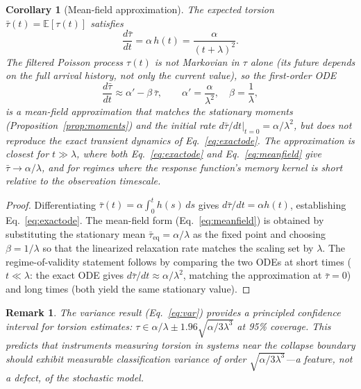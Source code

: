 \documentclass[11pt]{article}
\theoremstyle{plain}
\newtheorem{remark}{Remark}[section]
\newtheorem{corollary}{Corollary}[section]
\begin{document}
\begin{corollary}[Mean-field approximation]\label{cor:meanfield}
The expected torsion $\bar\tau(t) = \mathbb{E}[\tau(t)]$ satisfies
\begin{equation}\label{eq:exactode}
  \frac{d\bar\tau}{dt} = \alpha\, h(t) = \frac{\alpha}{(t + \lambda)^2}.
\end{equation}
The filtered Poisson process $\tau(t)$ is not Markovian in $\tau$ alone (its future depends on the
full arrival history, not only the current value), so the first-order ODE
\begin{equation}\label{eq:meanfield}
  \frac{d\bar\tau}{dt} \approx \alpha' - \beta\, \bar\tau, \qquad
  \alpha' = \frac{\alpha}{\lambda^2}, \quad \beta = \frac{1}{\lambda},
\end{equation}
is a mean-field approximation that matches the stationary moments
(Proposition~\ref{prop:moments}) and the initial rate
$d\bar\tau/dt|_{t=0} = \alpha/\lambda^2$, but does not reproduce the exact transient dynamics of
Eq.~\eqref{eq:exactode}. The approximation is closest for $t \gg \lambda$, where both
Eq.~\eqref{eq:exactode} and Eq.~\eqref{eq:meanfield} give $\bar\tau \to \alpha/\lambda$, and for
regimes where the response function's memory kernel is short relative to the observation timescale.
\end{corollary}

\begin{proof}
Differentiating $\bar\tau(t) = \alpha \int_0^t h(s)\, ds$ gives $d\bar\tau/dt = \alpha h(t)$,
establishing Eq.~\eqref{eq:exactode}. The mean-field form (Eq.~\eqref{eq:meanfield}) is obtained by
substituting the stationary mean $\bar\tau_{\mathrm{eq}} = \alpha/\lambda$ as the fixed point and
choosing $\beta = 1/\lambda$ so that the linearized relaxation rate matches the scaling set by
$\lambda$. The regime-of-validity statement follows by comparing the two ODEs at short times
($t \ll \lambda$: the exact ODE gives $d\bar\tau/dt \approx \alpha/\lambda^2$, matching the
approximation at $\bar\tau = 0$) and long times (both yield the same stationary value).
\end{proof}

\begin{remark}
The variance result (Eq.~\eqref{eq:var}) provides a principled confidence interval for torsion
estimates: $\tau \in \alpha/\lambda \pm 1.96\sqrt{\alpha/3\lambda^3}$ at 95\% coverage. This
predicts that instruments measuring torsion in systems near the collapse boundary should exhibit
measurable classification variance of order $\sqrt{\alpha/3\lambda^3}$---a feature, not a defect,
of the stochastic model.
\end{remark}
\end{document}
